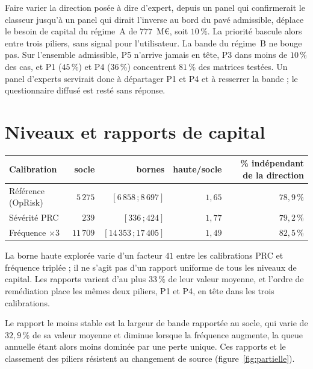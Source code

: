 \vspace{2pt}
\noindent Faire varier la direction posée à dire d'expert, depuis un panel qui confirmerait le classeur
jusqu'à un panel qui dirait l'inverse au bord du pavé admissible, déplace le besoin de capital du
régime~A de $777$~M\euro{}, soit $10\,\%$. La priorité bascule alors entre trois piliers, sans signal
pour l'utilisateur. La
bande du régime~B ne bouge pas. Sur l'ensemble admissible, P5 n'arrive jamais en tête, P3 dans moins
de $10\,\%$ des cas, et P1 ($45\,\%$) et P4 ($36\,\%$) concentrent $81\,\%$ des matrices testées. Un panel d'experts servirait donc à départager
P1 et P4 et à resserrer la bande ; le questionnaire diffusé est resté sans réponse.


\section{Niveaux et rapports de capital}

\begin{center}\footnotesize
\renewcommand{\arraystretch}{1.25}
\begin{tabular}{@{}p{4.3cm} r r r r@{}}
\toprule
\textbf{Calibration} & \textbf{socle} & \textbf{bornes} &
\textbf{haute/socle} & \textbf{\% indépendant de la direction} \\
\midrule
Référence (OpRisk)   & $5\,275$  & $[6\,858\,;8\,697]$   & $1{,}65$ & $78{,}9\,\%$ \\
Sévérité PRC         & $239$     & $[336\,;424]$         & $1{,}77$ & $79{,}2\,\%$ \\
Fréquence $\times 3$ & $11\,709$ & $[14\,353\,;17\,405]$ & $1{,}49$ & $82{,}5\,\%$ \\
\bottomrule
\end{tabular}
\end{center}

\vspace{2pt}
\noindent La borne haute explorée varie d'un facteur $41$ entre les calibrations PRC et fréquence triplée ; il ne s'agit pas d'un rapport uniforme de tous les niveaux de capital. Les
rapports varient d'au plus $33\,\%$ de leur valeur moyenne, et l'ordre de remédiation place les mêmes
deux piliers, P1 et P4, en tête dans les trois calibrations.

Le rapport le moins stable est la largeur de bande rapportée au socle, qui varie de $32{,}9\,\%$ de sa valeur moyenne et
diminue lorsque la fréquence augmente, la queue annuelle étant alors moins dominée par une perte
unique. Ces rapports et le classement des piliers résistent au changement de source (figure~\ref{fig:partielle}).

